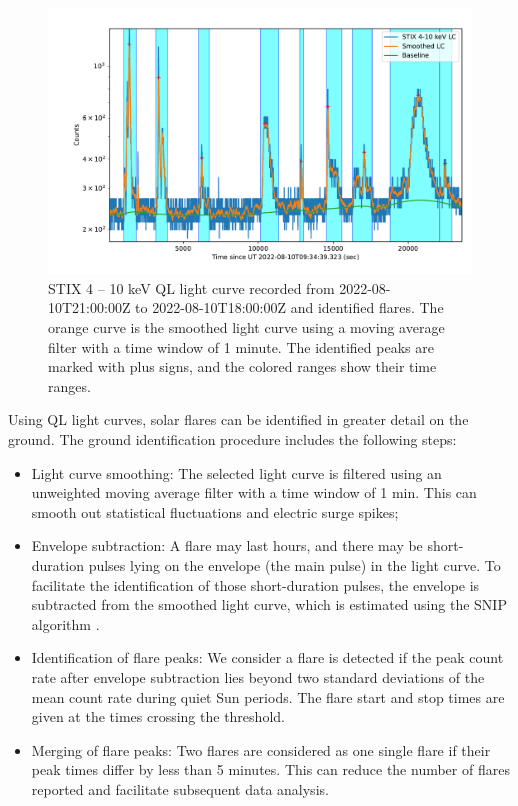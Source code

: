 \documentclass[referee]{aa} %
\begin{document}
\begin{figure}
  \centering
  \includegraphics[width=0.8\linewidth]{figures/flaredet.pdf}
  \caption{STIX 4 -- 10 keV QL light curve recorded from 2022-08-10T21:00:00Z to 2022-08-10T18:00:00Z and  identified flares. The orange curve is the smoothed light curve using a moving average filter with a time window of 1 minute. 
  The identified peaks are marked with plus signs, and the colored ranges show their time ranges.
  }
  \label{fig:flare-det}
\end{figure}
Using QL light curves, solar flares can be identified in greater detail on the ground. 
The ground identification procedure includes the following steps:
\begin{itemize}
  \item Light curve smoothing: The selected light curve is filtered using an unweighted
  moving average filter with a time window of 1 min. This can smooth out statistical fluctuations and electric surge spikes;
  \item Envelope subtraction:  A flare may last hours, and there may be short-duration pulses lying on the envelope (the main pulse) in the light curve.  To facilitate the identification of those short-duration pulses, the envelope is subtracted from the smoothed light curve, which is estimated using the SNIP algorithm \cite{snip}. 
  \item Identification of flare peaks: We consider a flare is detected 
 if the peak count rate after envelope subtraction lies beyond two standard deviations 
 of the mean count rate during quiet Sun periods. 
  The flare start and stop times are given at the times crossing the threshold.  
  \item Merging of flare peaks: Two flares are considered as one single flare if their peak times differ by less than 5 minutes. This can reduce the number of flares reported and facilitate subsequent data analysis.  
\end{itemize}
\end{document}
